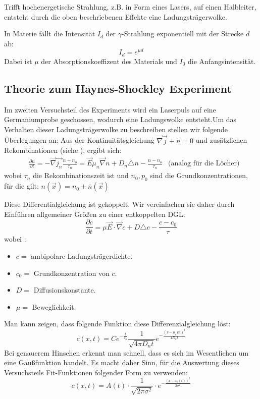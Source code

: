 \documentclass[12pt]{article}
\newcommand{\nab}{\vec{\nabla}} %
\begin{document}
Trifft hochenergetische Strahlung, z.B. in Form eines Lasers, auf einen Halbleiter, entsteht durch die oben beschriebenen Effekte eine Ladungsträgerwolke.

In Materie fällt die Intensität $I_d$ der $\gamma$-Strahlung exponentiell mit der Strecke $d$ ab:
\[I_d=e^{\mu d}\]
Dabei ist $\mu$ der Absorptionskoeffizent des Materials und $I_0$ die Anfangsintensität.

\subsection{Theorie zum Haynes-Shockley Experiment}
\label{teil3theorie}
Im zweiten Versuchsteil des Experiments wird ein Laserpuls auf eine Germaniumprobe geschossen, wodurch eine Ladungswolke entsteht.Um das Verhalten dieser Ladungsträgerwolke zu beschreiben stellen wir folgende Überlegungen an: Aus der Kontinuitätsgleichung $\vec{\nabla}\vec{j}+\dot{n}=0$ und zusätzlichen Rekombinationen (siehe \cite{staat}), ergibt sich:
\begin{align*}
&\frac{\partial n}{\partial t}=-\vec{\nabla}\vec{j_n}\frac{n-n_o}{\tau_n}=\vec{E}\mu_n\vec{\nabla}n+D_n\triangle n-\frac{n-n_o}{\tau_n}&\mbox{(analog für die Löcher)}
\end{align*}
wobei  $\tau_n$ die  Rekombinationszeit ist und $n_0,p_0$ sind die Grundkonzentrationen, für die gilt: $n(\vec{x})=n_0+\bar{n}(\vec{x})$

Diese Differentialgleichung ist gekoppelt. Wir vereinfachen sie daher durch Einführen allgemeiner Größen zu einer entkoppelten DGL:
\[\frac{\partial c}{\partial t}=\mu\vec{E}\cdot\nab c+D\triangle c-\frac{c-c_0}{\tau}\]
wobei :
\begin{itemize}
	\item $c=$  ambipolare Ladungsträgerdichte.
	\item $c_0=$  Grundkonzentration von $c$.
	\item $D=$  Diffusionskonstante.
	\item $\mu=$ Beweglichkeit.
\end{itemize}
Man kann zeigen, dass folgende Funktion diese Differenzialgleichung löst:
\[c(x,t)=Ce^{-\frac{t}{\tau_n}}\frac{1}{\sqrt{4\pi D_n t}}e^{-\frac{(x-\mu_n E t)^2}{4D_n t}}\]
Bei genauerem Hinsehen erkennt man schnell, dass es sich im Wesentlichen um eine Gaußfunktion handelt. Es macht daher Sinn, für die Auswertung dieses Versuchsteils Fit-Funktionen folgender Form zu verwenden:
\[c(x,t)=A(t)\cdot\frac{1}{\sqrt{2\pi\sigma^2}}\cdot e^{-\frac{(x-x_c(t))^2}{2\sigma^2}}\]
\end{document}
